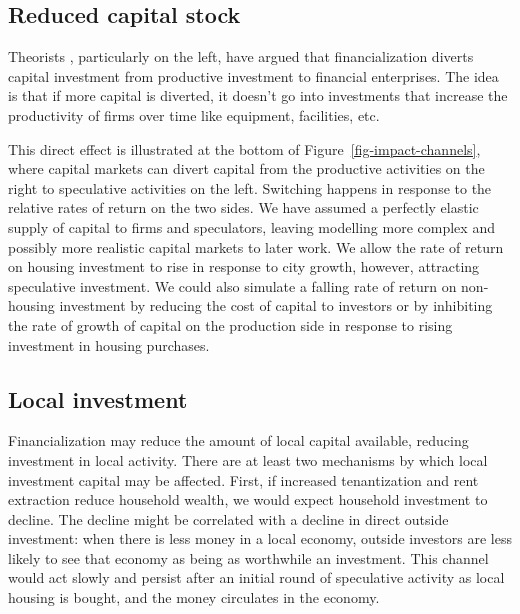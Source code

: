 
\subsection{Reduced capital stock}

Theorists \cite{lefebvreRevolutionUrbaine1970, harveyClassmonopolyRentFinance1974, harveyUrbanProcessCapitalism1978, christophersRevisitingUrbanizationCapital2011}, particularly on the left, have argued that financialization diverts capital investment from productive investment to financial enterprises. The idea is that if more capital is diverted, it doesn't go into investments that increase the productivity of firms over time like equipment, facilities, etc. 

This direct effect is illustrated at the bottom of Figure~\ref{fig-impact-channels}, where capital markets can divert capital from the productive activities on the right to speculative activities on the left. Switching happens in response to the relative rates of return on the two sides. We have assumed a perfectly elastic supply of capital to firms and speculators, leaving modelling more complex and possibly more realistic capital markets to later work. We allow the rate of return on housing investment to rise in response to city growth, however, attracting speculative investment. We could also simulate a falling rate of return on non-housing investment by reducing the cost of capital to investors or by inhibiting the rate of growth of capital on the production side in response to rising investment in housing purchases. %


\subsection{Local investment}

Financialization may reduce the amount of local capital available, reducing investment in local activity. %
There are at least two mechanisms by which local investment capital may be affected. First, if increased tenantization and rent extraction reduce household wealth, we would expect household investment to decline. The decline might be correlated with a decline in direct outside investment: when there is less money in a local economy, outside investors are less likely to see that economy as being as worthwhile an investment. 
This channel would act slowly and persist after an initial round of speculative activity as local housing is bought, and the money circulates in the economy. %


